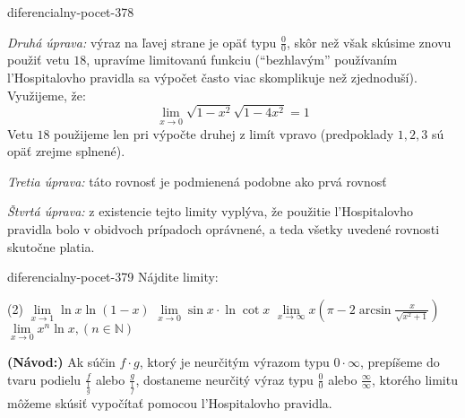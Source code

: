 \begin{defproblem}{diferencialny-pocet-378}
\begin{solution}
  \textit{Druhá úprava:}
  výraz na ľavej strane je opäť typu $\frac{0}{0}$, skôr než však skúsime znovu
  použiť vetu $18$, upravíme limitovanú funkciu (\enquote{bezhlavým} používaním
  l'Hospitalovho pravidla sa výpočet často viac skomplikuje než zjednoduší).
  Využijeme, že:
  \[
    \lim_{x \rightarrow 0}\sqrt{1-x^2}\sqrt{1-4x^2} = 1
  \]
  Vetu $18$ použijeme len pri výpočte druhej z limít vpravo (predpoklady $1,2,3$
  sú opäť zrejme splnené).

  \textit{Tretia úprava:}
  táto rovnosť je podmienená podobne ako prvá rovnosť

  \textit{Štvrtá úprava:}
  z existencie tejto limity vyplýva, že použitie l'Hospitalovho pravidla bolo v
  obidvoch prípadoch oprávnené, a teda všetky uvedené rovnosti skutočne platia.
\end{solution}
\end{defproblem}

\begin{defproblem}{diferencialny-pocet-379}
Nájdite limity:
\begin{tasks}(2)
  \task $\lim\limits_{x \rightarrow 1}\ln x \ln (1-x)$
  \task $\lim\limits_{x \rightarrow 0}\sin x\cdot\ln \cot x$
  \task $\lim\limits_{x \rightarrow \infty}x(\pi-2\arcsin\frac{x}{\sqrt{x^2+1}})$
  \task $\lim\limits_{x \rightarrow 0}x^n\ln x,(n\in\mathbb{N})$
\end{tasks}

\begin{solution}
  \textbf{(Návod:)}
  Ak súčin $f\cdot g$, ktorý je neurčitým výrazom typu $0\cdot\infty$, prepíšeme
  do tvaru podielu $\frac{f}{\frac{1}{g}}$ alebo $\frac{g}{\frac{1}{f}}$,
  dostaneme neurčitý výraz typu $\frac{0}{0}$ alebo $\frac{\infty}{\infty}$,
  ktorého limitu môžeme skúsiť vypočítať pomocou l'Hospitalovho pravidla.
\end{solution}
\end{defproblem}

